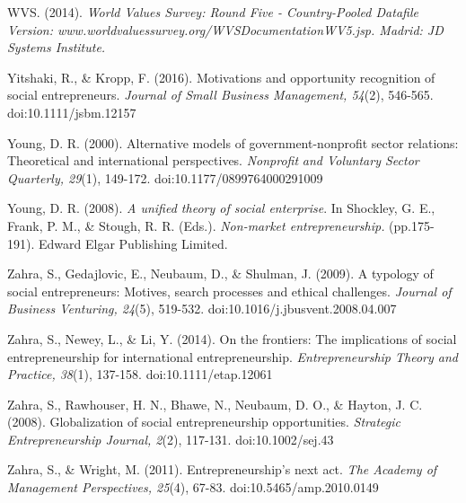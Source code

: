 \documentclass{article}
\begin{document}
WVS. (2014). \emph{World Values Survey: Round Five - Country-Pooled Datafile Version: www.worldvaluessurvey.org/WVSDocumentationWV5.jsp. Madrid: JD Systems Institute.} 

Yitshaki, R., \& Kropp, F. (2016). Motivations and opportunity recognition of social entrepreneurs. \emph{Journal of Small Business Management, 54}(2), 546-565. doi:10.1111/jsbm.12157

Young, D. R. (2000). Alternative models of government-nonprofit sector relations: Theoretical and international perspectives. \emph{Nonprofit}\emph{ and Voluntary Sector Quarterly, 29}(1), 149-172. doi:10.1177/0899764000291009

Young, D. R. (2008). \emph{A unified theory of social enterprise}. In Shockley, G. E., Frank, P. M., \& Stough, R. R. (Eds.). \emph{Non-market entrepreneurship. }(pp.175-191). Edward Elgar Publishing Limited. 

Zahra, S., Gedajlovic, E., Neubaum, D., \& Shulman, J. (2009). A typology of social entrepreneurs: Motives, search processes and ethical challenges. \emph{Journal of Business Venturing, 24}(5), 519-532. doi:10.1016/j.jbusvent.2008.04.007

Zahra, S., Newey, L., \& Li, Y. (2014). On the frontiers: The implications of social entrepreneurship for international entrepreneurship. \emph{Entrepreneurship Theory and Practice, 38}(1), 137-158. doi:10.1111/etap.12061

Zahra, S., Rawhouser, H. N., Bhawe, N., Neubaum, D. O., \& Hayton, J. C. (2008). Globalization of social entrepreneurship opportunities. \emph{Strategic Entrepreneurship Journal, 2}(2), 117-131. doi:10.1002/sej.43

Zahra, S., \& Wright, M. (2011). Entrepreneurship's next act. \emph{The Academy of Management Perspectives, 25}(4), 67-83. doi:10.5465/amp.2010.0149
\end{document}
